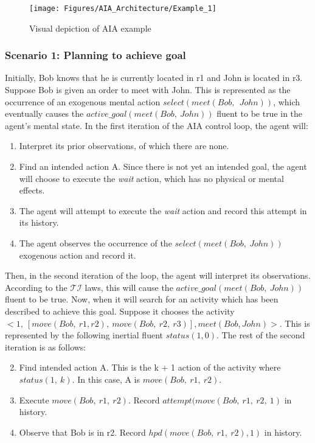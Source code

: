\begin{figure}
    \centering
    \texttt{[image: Figures/AIA\_Architecture/Example\_1]}
    \caption{Visual depiction of AIA example}
    \label{fig:aia_example}
\end{figure}

\subsubsection{Scenario 1: Planning to achieve goal~\cite{blount_towards_2014}}
\label{subsubsec:aia_scenario_1}

Initially, Bob knows that he is currently located in r1 and John is located in r3.
Suppose Bob is given an order to meet with John.
This is represented as the occurrence of an exogenous mental action $select(meet(Bob,\ \ John))$, which eventually causes the $active\_goal(meet(Bob,\ John))$ fluent to be true in the agent's mental state.
In the first iteration of the AIA control loop, the agent will:

\begin{enumerate}
    \item Interpret its prior observations, of which there are none.
    \item Find an intended action A.
        Since there is not yet an intended goal, the agent will choose to execute the \textit{wait} action, which has no physical or mental effects.
    \item The agent will attempt to execute the \textit{wait} action and record this attempt in its history.
    \item The agent observes the occurrence of the $select(meet(Bob,\ John))$ exogenous action and record it.
\end{enumerate}

Then, in the second iteration of the loop, the agent will interpret its observations.
According to the $\mathcal{TI}$ laws, this will cause the $active\_goal(meet(Bob,\ John))$ fluent to be true.
Now, when it will search for an activity which has been described to achieve this goal.
Suppose it chooses the activity $<1,\ [move(Bob,\ r1,r2),\ move(Bob,\ r2,\ r3)],meet(Bob,John)>$.
This is represented by the following inertial fluent $status(1,0)$.
The rest of the second iteration is as follows:

\begin{enumerate}
    \setcounter{enumi}{1}
    \item Find intended action A.
        This is the k + 1 action of the activity where $status(1,\ k)$.
        In this case, A is $move(Bob,\ r1,\ r2)$.
    \item Execute $move(Bob,\ r1,\ r2)$.
        Record $attempt(move(Bob,\ r1,\ r2,\ 1)$ in history.
    \item Observe that Bob is in r2.
        Record $hpd(move(Bob,\ r1,\ r2),1)$ in history.
\end{enumerate}

